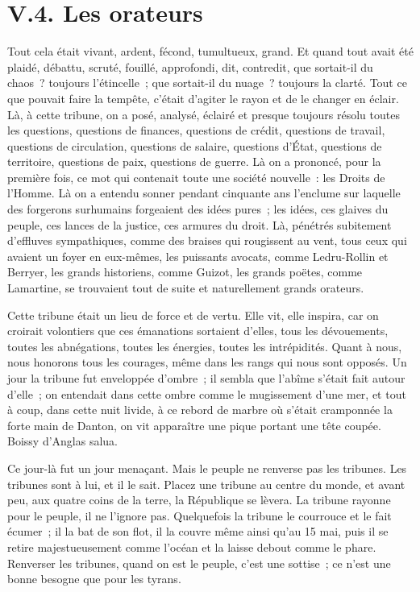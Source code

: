 \documentclass[french,twoside]{book} %
\begin{document}
\section[{V.4. Les orateurs}]{V.4. Les orateurs}

\noindent Tout cela était vivant, ardent, fécond, tumultueux, grand. Et quand tout avait été plaidé, débattu, scruté, fouillé, approfondi, dit, contredit, que sortait-il du chaos ? toujours l’étincelle ; que sortait-il du nuage ? toujours la clarté. Tout ce que pouvait faire la tempête, c’était d’agiter le rayon et de le changer en éclair. Là, à cette tribune, on a posé, analysé, éclairé et presque toujours résolu toutes les questions, questions de finances, questions de crédit, questions de travail, questions de circulation, questions de salaire, questions d’État, questions de territoire, questions de paix, questions de guerre. Là on a prononcé, pour la première fois, ce mot qui contenait toute une société nouvelle : les Droits de l’Homme. Là on a entendu sonner pendant cinquante ans l’enclume sur laquelle des forgerons surhumains forgeaient des idées pures ; les idées, ces glaives du peuple, ces lances de la justice, ces armures du droit. Là, pénétrés subitement d’effluves sympathiques, comme des braises qui rougissent au vent, tous ceux qui avaient un foyer en eux-mêmes, les puissants avocats, comme Ledru-Rollin et Berryer, les grands historiens, comme Guizot, les grands poëtes, comme Lamartine, se trouvaient tout de suite et naturellement grands orateurs.\par
Cette tribune était un lieu de force et de vertu. Elle vit, elle inspira, car on croirait volontiers que ces émanations sortaient d’elles, tous les dévouements, toutes les abnégations, toutes les énergies, toutes les intrépidités. Quant à nous, nous honorons tous les courages, même dans les rangs qui nous sont opposés. Un jour la tribune fut enveloppée d’ombre ; il sembla que l’abîme s’était fait autour d’elle ; on entendait dans cette ombre comme le mugissement d’une mer, et tout à coup, dans cette nuit livide, à ce rebord de marbre où s’était cramponnée la forte main de Danton, on vit apparaître une pique portant une tête coupée. Boissy d’Anglas salua.\par
Ce jour-là fut un jour menaçant. Mais le peuple ne renverse pas les tribunes. Les tribunes sont à lui, et il le sait. Placez une tribune au centre du monde, et avant peu, aux quatre coins de la terre, la République se lèvera. La tribune rayonne pour le peuple, il ne l’ignore pas. Quelquefois la tribune le courrouce et le fait écumer ; il la bat de son flot, il la couvre même ainsi qu’au 15 mai, puis il se retire majestueusement comme l’océan et la laisse debout comme le phare. Renverser les tribunes, quand on est le peuple, c’est une sottise ; ce n’est une bonne besogne que pour les tyrans.\par
\end{document}
